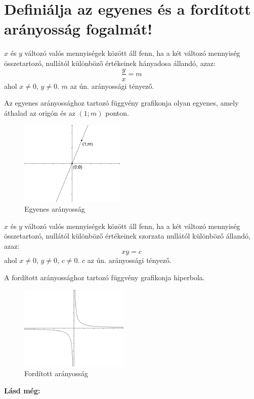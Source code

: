 
\section{Definiálja az egyenes és a fordított arányosság fogalmát!}
\label{005}

\begin{defin}
$x$ és $y$ változó valós mennyiségek között  áll
fenn, ha a két változó mennyiség összetartozó, nullától különböző értékeinek
hányadosa állandó, azaz:
\[
\frac{y}{x} = m
\]
ahol $x \neq 0$, $y \neq 0$. $m$ az ún. arányossági tényező.

Az egyenes arányossághoz tartozó függvény grafikonja olyan egyenes, amely
áthalad az origón és az $(1; m)$ ponton.

\begin{figure}[!h]
	\centering
	\includegraphics[height=4cm]{../images/005_direct_propp}
	\caption{Egyenes arányosság} 
\end{figure}
\end{defin}

\begin{defin}
$x$ és $y$ változó valós mennyiségek között 
áll fenn, ha a két változó mennyiség összetartozó, nullától különböző
értékeinek szorzata nullától különböző állandó, azaz:
\[
xy = c
\]
ahol $x \neq 0$, $y \neq 0$, $c \neq 0$. $c$ az ún. arányossági tényező.

A fordított arányossághoz tartozó függvény grafikonja hiperbola.

\begin{figure}[!h]
	\centering
	\includegraphics[height=4cm]{../images/005_indirect_propp}
	\caption{Fordított arányosság} 
	\label{fig:inverserate}
\end{figure}
\end{defin}

\textbf{Lásd még:}
